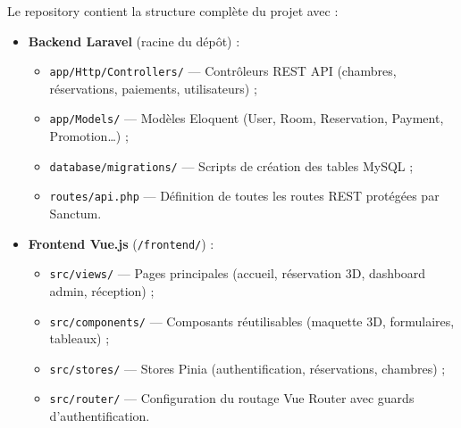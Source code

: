 \documentclass[12pt, a4paper]{report}
\begin{document}
Le repository contient la structure complète du projet avec :
\begin{itemize}
  \item \textbf{Backend Laravel} (racine du dépôt) :
    \begin{itemize}
      \item \texttt{app/Http/Controllers/} — Contrôleurs REST API (chambres, réservations, paiements, utilisateurs) ;
      \item \texttt{app/Models/} — Modèles Eloquent (User, Room, Reservation, Payment, Promotion\ldots) ;
      \item \texttt{database/migrations/} — Scripts de création des tables MySQL ;
      \item \texttt{routes/api.php} — Définition de toutes les routes REST protégées par Sanctum.
    \end{itemize}
  \item \textbf{Frontend Vue.js} (\texttt{/frontend/}) :
    \begin{itemize}
      \item \texttt{src/views/} — Pages principales (accueil, réservation 3D, dashboard admin, réception) ;
      \item \texttt{src/components/} — Composants réutilisables (maquette 3D, formulaires, tableaux) ;
      \item \texttt{src/stores/} — Stores Pinia (authentification, réservations, chambres) ;
      \item \texttt{src/router/} — Configuration du routage Vue Router avec guards d'authentification.
    \end{itemize}
\end{itemize}

\printbibliography[heading=bibintoc, title={Bibliographie}]

%
%
%
%
%
%
\end{document}
